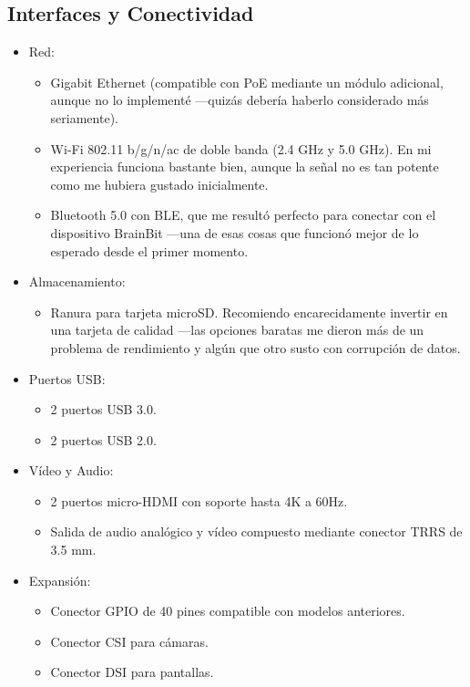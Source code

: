     \subsection{Interfaces y Conectividad}
    \begin{itemize}
        \item Red:
        \begin{itemize}
            \item Gigabit Ethernet (compatible con PoE mediante un módulo adicional, aunque no lo implementé —quizás debería haberlo considerado más seriamente).
            \item Wi-Fi 802.11 b/g/n/ac de doble banda (2.4 GHz y 5.0 GHz). En mi experiencia funciona bastante bien, aunque la señal no es tan potente como me hubiera gustado inicialmente.
            \item Bluetooth 5.0 con BLE, que me resultó perfecto para conectar con el dispositivo BrainBit —una de esas cosas que funcionó mejor de lo esperado desde el primer momento.
        \end{itemize}
        \item Almacenamiento:
        \begin{itemize}
            \item Ranura para tarjeta microSD. Recomiendo encarecidamente invertir en una tarjeta de calidad —las opciones baratas me dieron más de un problema de rendimiento y algún que otro susto con corrupción de datos.
        \end{itemize}
        \item Puertos USB:
        \begin{itemize}
            \item 2 puertos USB 3.0.
            \item 2 puertos USB 2.0.
        \end{itemize}
        \item Vídeo y Audio:
        \begin{itemize}
            \item 2 puertos micro-HDMI con soporte hasta 4K a 60Hz.
            \item Salida de audio analógico y vídeo compuesto mediante conector TRRS de 3.5 mm.
        \end{itemize}
        \item Expansión:
        \begin{itemize}
            \item Conector GPIO de 40 pines compatible con modelos anteriores.
            \item Conector CSI para cámaras.
            \item Conector DSI para pantallas.
        \end{itemize}
    \end{itemize}

